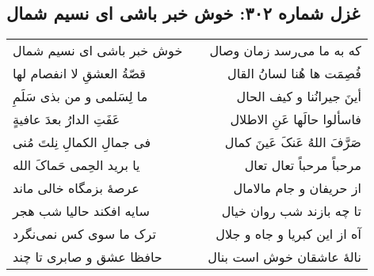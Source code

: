 \begin{center}
\section*{غزل شماره ۳۰۲: خوش خبر باشی ای نسیم شمال}
\label{sec:sh302}
\begin{longtable}{l p{0.5cm} r}
خوش خبر باشی ای نسیم شمال
&&
که به ما می‌رسد زمان وصال
\\
قصّةُ العشقِ لا انفصام لها
&&
فُصِمَت ها هُنا لسانُ القال
\\
ما لِسَلمی و من بذی سَلَمِ
&&
أینَ جیرانُنا و کیف الحال
\\
عَفَتِ الدارُ بعدَ عافیةٍ
&&
فاسألوا حالَها عَنِ الاطلال
\\
فی جمالِ الکمالِ نِلتَ مُنی
&&
صَرَّفَ اللهُ عَنکَ عَینَ کمال
\\
یا برید الحِمی حَماکَ الله
&&
مرحباً مرحباً تعال تعال
\\
عرصهٔ بزمگاه خالی ماند
&&
از حریفان و جام مالامال
\\
سایه افکند حالیا شب هجر
&&
تا چه بازند شب روان خیال
\\
ترک ما سوی کس نمی‌نگرد
&&
آه از این کبریا و جاه و جلال
\\
حافظا عشق و صابری تا چند
&&
نالهٔ عاشقان خوش است بنال
\\
\end{longtable}
\end{center}
